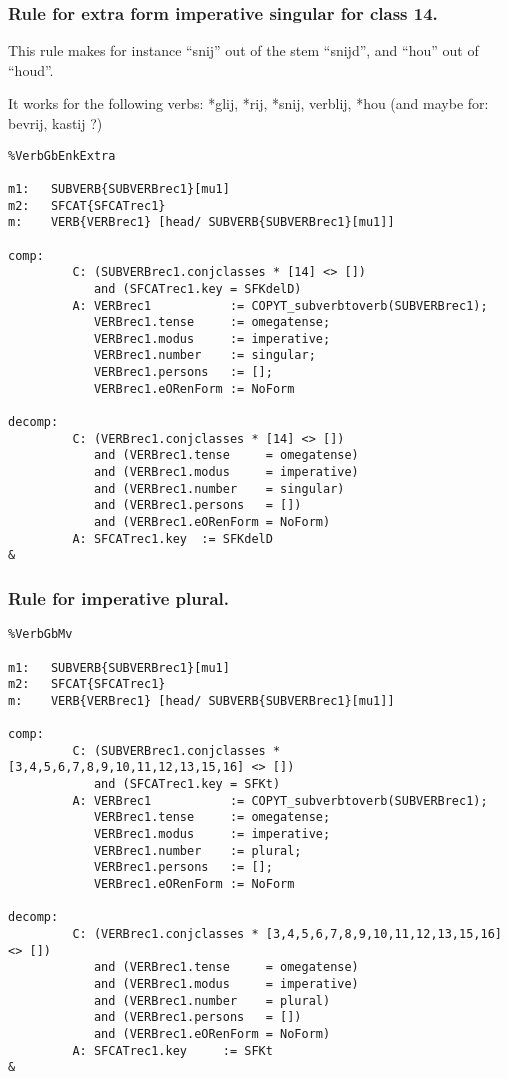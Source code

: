 \subsubsection{Rule for extra form imperative singular for class 14.}
This rule makes for instance ``snij'' out of the stem ``snijd'', and ``hou'' 
out of ``houd''.

It works for the following verbs: *glij, *rij, *snij, verblij, *hou 
(and maybe for: bevrij, kastij ?)

\begin{verbatim}
%VerbGbEnkExtra

m1:   SUBVERB{SUBVERBrec1}[mu1]
m2:   SFCAT{SFCATrec1}
m:    VERB{VERBrec1} [head/ SUBVERB{SUBVERBrec1}[mu1]]

comp:        
         C: (SUBVERBrec1.conjclasses * [14] <> [])
            and (SFCATrec1.key = SFKdelD)
         A: VERBrec1           := COPYT_subverbtoverb(SUBVERBrec1);
            VERBrec1.tense     := omegatense;
            VERBrec1.modus     := imperative;
            VERBrec1.number    := singular;
            VERBrec1.persons   := [];
            VERBrec1.eORenForm := NoForm

decomp:      
         C: (VERBrec1.conjclasses * [14] <> []) 
            and (VERBrec1.tense     = omegatense) 
            and (VERBrec1.modus     = imperative)
            and (VERBrec1.number    = singular) 
            and (VERBrec1.persons   = [])
            and (VERBrec1.eORenForm = NoForm)
         A: SFCATrec1.key  := SFKdelD
&
\end{verbatim}
\newpage
\subsubsection{Rule for imperative plural.}
\begin{verbatim}
%VerbGbMv 

m1:   SUBVERB{SUBVERBrec1}[mu1]
m2:   SFCAT{SFCATrec1}
m:    VERB{VERBrec1} [head/ SUBVERB{SUBVERBrec1}[mu1]]

comp:
         C: (SUBVERBrec1.conjclasses * [3,4,5,6,7,8,9,10,11,12,13,15,16] <> [])
            and (SFCATrec1.key = SFKt)
         A: VERBrec1           := COPYT_subverbtoverb(SUBVERBrec1);
            VERBrec1.tense     := omegatense;
            VERBrec1.modus     := imperative;
            VERBrec1.number    := plural;
            VERBrec1.persons   := [];
            VERBrec1.eORenForm := NoForm

decomp:
         C: (VERBrec1.conjclasses * [3,4,5,6,7,8,9,10,11,12,13,15,16] <> []) 
            and (VERBrec1.tense     = omegatense) 
            and (VERBrec1.modus     = imperative)
            and (VERBrec1.number    = plural) 
            and (VERBrec1.persons   = [])
            and (VERBrec1.eORenForm = NoForm) 
         A: SFCATrec1.key     := SFKt
&
\end{verbatim}
\newpage
